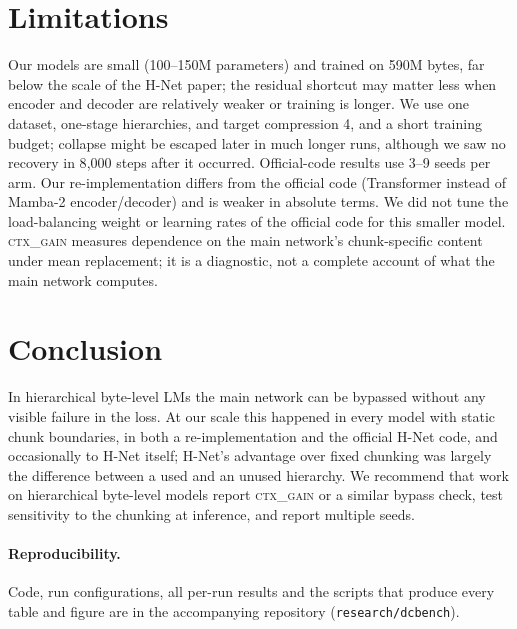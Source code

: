 \documentclass[10pt]{article}
\newcommand{\ctx}{\textsc{ctx\_gain}}
\begin{document}
\section{Limitations}

Our models are small (100--150M parameters) and trained on 590M bytes, far below the scale of
the H-Net paper; the residual shortcut may matter less when encoder and decoder are relatively
weaker or training is longer. We use one dataset, one-stage hierarchies, and target compression
4, and a short training budget; collapse might be escaped later in much longer runs, although we
saw no recovery in 8{,}000 steps after it occurred. Official-code results use 3--9 seeds per arm.
Our re-implementation differs from the official code (Transformer instead of Mamba-2
encoder/decoder) and is weaker in absolute terms. We did not tune the load-balancing weight or
learning rates of the official code for this smaller model. \ctx{} measures dependence
on the main network's chunk-specific content under mean replacement; it is a diagnostic, not a
complete account of what the main network computes.

\section{Conclusion}

In hierarchical byte-level LMs the main network can be bypassed without any visible failure in
the loss. At our scale this happened in every model with static chunk boundaries, in both a
re-implementation and the official H-Net code, and occasionally to H-Net itself; H-Net's
advantage over fixed chunking was largely the difference between a used and an unused
hierarchy. We recommend that work on hierarchical byte-level models report \ctx{} or a similar
bypass check, test sensitivity to the chunking at inference, and report multiple seeds.

\paragraph{Reproducibility.} Code, run configurations, all per-run results and the scripts that
produce every table and figure are in the accompanying repository (\texttt{research/dcbench}).




\appendix
\end{document}

